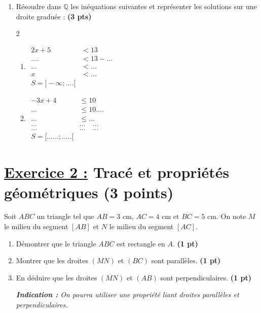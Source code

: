 \documentclass[12pt,a4paper]{article}
\begin{document}
\begin{enumerate}
    \item Résoudre dans $\mathbb{Q}$ les inéquations suivantes et représenter les solutions sur une droite graduée : \textbf{(3 pts)}
\begin{multicols}{2}
\setlength{\columnseprule}{0.1mm}
\begin{enumerate}
\item[]
\(
\begin{aligned}
2x + 5 &< 13\\[0.5cm]
.... &< 13 - ...\\[0.5cm]
... &< ...\\[0.5cm]
x &< ...\\[0.5cm]
\boxed{S=]-\infty;....[}
\end{aligned}
\)
\item[]
\(
\begin{aligned}
-3x + 4 &\leq 10\\[0.5cm]
... &\leq 10....\\[0.5cm]
... &\leq ...\\[0.5cm]
...\quad &...\quad... \\[0.5cm]
...\quad &...\quad...\\[0.5cm]
\boxed{S=[......;.....[}
\end{aligned}
\)

\end{enumerate}
\end{multicols}  
\end{enumerate}

\section*{\underline{Exercice 2 :} Tracé et propriétés géométriques (3 points)}

Soit $ABC$ un triangle tel que $AB = 3\text{ cm}$, $AC = 4\text{ cm}$ et $BC = 5\text{ cm}$.
On note $M$ le milieu du segment $[AB]$ et $N$ le milieu du segment $[AC]$.

\begin{enumerate}
    \item Démontrer que le triangle $ABC$ est rectangle en $A$. \hfill \textbf{(1 pt)}
    \item Montrer que les droites $(MN)$ et $(BC)$ sont parallèles. \hfill \textbf{(1 pt)}
    \item En déduire que les droites $(MN)$ et $(AB)$ sont perpendiculaires. \hfill \textbf{(1 pt)}
    \begin{center}
        \textit{\textbf{Indication :} On pourra utiliser une propriété liant droites parallèles et perpendiculaires.}
    \end{center}
\end{enumerate}
\end{document}
